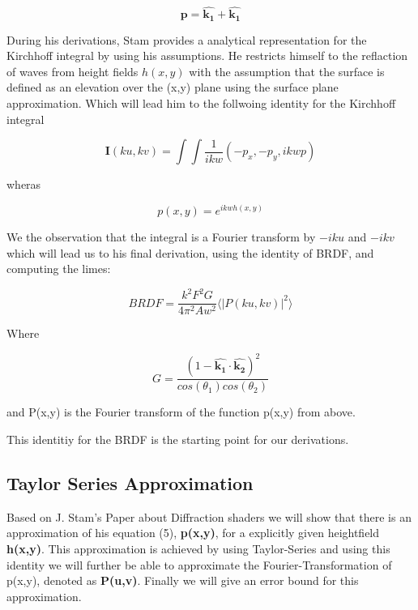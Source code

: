 \begin{equation*}
    \mathbf{p} = \hat{\mathbf{k_1}} + \hat{\mathbf{k_1}}
\end{equation*}

During his derivations, Stam provides a analytical representation for the Kirchhoff integral by using his assumptions. He restricts himself to the reflaction of waves from height fields $h(x,y)$ with the assumption that the surface is defined as an elevation over the (x,y) plane using the surface plane approximation.
Which will lead him to the follwoing identity for the Kirchhoff integral

\begin{equation}
    \mathbf{I}(ku, kv) = \int \int \frac{1}{ikw}(-p_x, -p_y, ikwp) 
\end{equation}

wheras 

\begin{equation}
    p(x,y) = e^{ikwh(x,y)}
\end{equation}

We the observation that the integral is a Fourier transform by $-iku$ and $-ikv$
which will lead us to his final derivation, using the identity of BRDF, and computing the limes:

\begin{equation}
    BRDF = \frac{k^2 F^2 G}{4\pi^2 A w^2} \langle \left|P(ku, kv)\right|^2\rangle
\end{equation}

Where 

\begin{equation}
    G = \frac{(1-\hat{\mathbf{k_1}}\cdot\hat{\mathbf{k_2}})^2}{cos(\theta_1)cos(\theta_2)}
\end{equation}

and P(x,y) is the Fourier transform of the function p(x,y) from above.

This identitiy for the BRDF is the starting point for our derivations.
 
\subsection{Taylor Series Approximation}

Based on J. Stam's Paper about Diffraction shaders we will show that
there is an approximation of his equation (5), \textbf{p(x,y)}, for
a explicitly given heightfield \textbf{h(x,y)}. This approximation
is achieved by using Taylor-Series and using this identity we will
further be able to approximate the Fourier-Transformation of p(x,y),
denoted as \textbf{P(u,v)}. Finally we will give an error bound for
this approximation.

